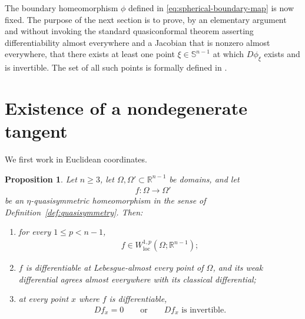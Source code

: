 \documentclass[11pt]{amsart}
\theoremstyle{plain}
\newtheorem{proposition}[theorem]{Proposition}
\theoremstyle{plain}
\theoremstyle{plain}
\newcommand{\R}{\mathbb R}
\numberwithin{equation}{section}
\begin{document}
The boundary homeomorphism \(\phi\)
defined in \eqref{eq:spherical-boundary-map} is now fixed.  The purpose of the next
section is to prove, by an elementary argument and without invoking
the standard quasiconformal theorem asserting differentiability almost
everywhere and a Jacobian that is nonzero almost everywhere, that there
exists at least one
point \(\xi\in\mathbb S^{n-1}\) at which \(D\phi_\xi\) exists and is
invertible.  The set of all such points is formally defined in
.


\section{Existence of a nondegenerate tangent}

We first work in Euclidean coordinates. 

\begin{proposition}\label{prop:elementary_qs_regular}
Let \(n\geq3\), let \(\Omega,\Omega'\subset\R^{n-1}\) be domains, and let
\begin{align}
f:\Omega\longrightarrow\Omega'\nonumber
\end{align}
be an \(\eta\)-quasisymmetric homeomorphism in the sense of
Definition~\ref{def:quasisymmetry}.  Then:
\begin{enumerate}[label=\textup{(\roman*)},leftmargin=3em]
\item
for every \(1\leq p<n-1\),
\begin{align}
f\in W^{1,p}_{\mathrm{loc}}(\Omega;\R^{n-1});\nonumber
\end{align}
\item
\(f\) is differentiable at Lebesgue-almost every point of
\(\Omega\), and its weak differential agrees almost everywhere with its
classical differential;
\item
at every point \(x\) where \(f\) is   differentiable,
\begin{align}
Df_x=0
\qquad\text{or}\qquad
Df_x\text{ is invertible}.
\label{eq:zero_or_invertible}
\end{align}
\end{enumerate}
\end{proposition}
\end{document}
